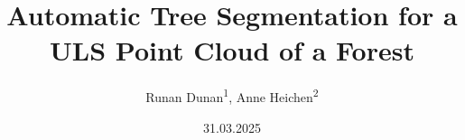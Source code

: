 \documentclass{isprs} %
\begin{document}
\title{Automatic Tree Segmentation for a ULS Point Cloud of a Forest}
\date{31.03.2025}



\author{Runan Dunan\textsuperscript{1}, Anne Heichen\textsuperscript{2}}

\address{\textsuperscript{1 }University of Heidelberg – mail@stud.uni-heidelberg.\\
{2 }University of Heidelberg – anne.heichen@stud.uni-heidelberg.\\}


\end{document}
